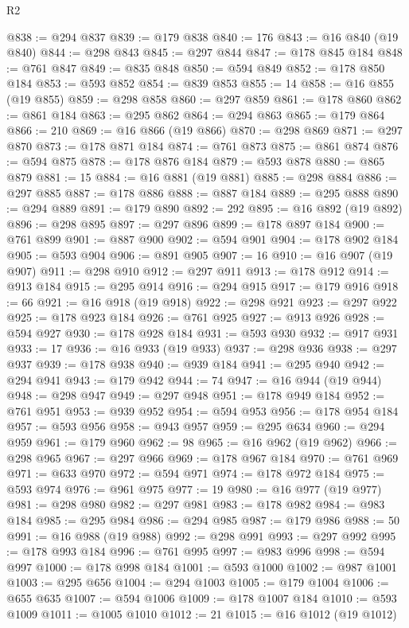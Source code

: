 \begin{lexlean}{R2}
\begin{coremodule}
@838 := @294 @837
@839 := @179 @838
@840 := 176
@843 := @16 @840 (@19 @840)
@844 := @298 @843
@845 := @297 @844
@847 := @178 @845 @184
@848 := @761 @847
@849 := @835 @848
@850 := @594 @849
@852 := @178 @850 @184
@853 := @593 @852
@854 := @839 @853
@855 := 14
@858 := @16 @855 (@19 @855)
@859 := @298 @858
@860 := @297 @859
@861 := @178 @860
@862 := @861 @184
@863 := @295 @862
@864 := @294 @863
@865 := @179 @864
@866 := 210
@869 := @16 @866 (@19 @866)
@870 := @298 @869
@871 := @297 @870
@873 := @178 @871 @184
@874 := @761 @873
@875 := @861 @874
@876 := @594 @875
@878 := @178 @876 @184
@879 := @593 @878
@880 := @865 @879
@881 := 15
@884 := @16 @881 (@19 @881)
@885 := @298 @884
@886 := @297 @885
@887 := @178 @886
@888 := @887 @184
@889 := @295 @888
@890 := @294 @889
@891 := @179 @890
@892 := 292
@895 := @16 @892 (@19 @892)
@896 := @298 @895
@897 := @297 @896
@899 := @178 @897 @184
@900 := @761 @899
@901 := @887 @900
@902 := @594 @901
@904 := @178 @902 @184
@905 := @593 @904
@906 := @891 @905
@907 := 16
@910 := @16 @907 (@19 @907)
@911 := @298 @910
@912 := @297 @911
@913 := @178 @912
@914 := @913 @184
@915 := @295 @914
@916 := @294 @915
@917 := @179 @916
@918 := 66
@921 := @16 @918 (@19 @918)
@922 := @298 @921
@923 := @297 @922
@925 := @178 @923 @184
@926 := @761 @925
@927 := @913 @926
@928 := @594 @927
@930 := @178 @928 @184
@931 := @593 @930
@932 := @917 @931
@933 := 17
@936 := @16 @933 (@19 @933)
@937 := @298 @936
@938 := @297 @937
@939 := @178 @938
@940 := @939 @184
@941 := @295 @940
@942 := @294 @941
@943 := @179 @942
@944 := 74
@947 := @16 @944 (@19 @944)
@948 := @298 @947
@949 := @297 @948
@951 := @178 @949 @184
@952 := @761 @951
@953 := @939 @952
@954 := @594 @953
@956 := @178 @954 @184
@957 := @593 @956
@958 := @943 @957
@959 := @295 @634
@960 := @294 @959
@961 := @179 @960
@962 := 98
@965 := @16 @962 (@19 @962)
@966 := @298 @965
@967 := @297 @966
@969 := @178 @967 @184
@970 := @761 @969
@971 := @633 @970
@972 := @594 @971
@974 := @178 @972 @184
@975 := @593 @974
@976 := @961 @975
@977 := 19
@980 := @16 @977 (@19 @977)
@981 := @298 @980
@982 := @297 @981
@983 := @178 @982
@984 := @983 @184
@985 := @295 @984
@986 := @294 @985
@987 := @179 @986
@988 := 50
@991 := @16 @988 (@19 @988)
@992 := @298 @991
@993 := @297 @992
@995 := @178 @993 @184
@996 := @761 @995
@997 := @983 @996
@998 := @594 @997
@1000 := @178 @998 @184
@1001 := @593 @1000
@1002 := @987 @1001
@1003 := @295 @656
@1004 := @294 @1003
@1005 := @179 @1004
@1006 := @655 @635
@1007 := @594 @1006
@1009 := @178 @1007 @184
@1010 := @593 @1009
@1011 := @1005 @1010
@1012 := 21
@1015 := @16 @1012 (@19 @1012)

\end{coremodule}
\end{lexlean}
